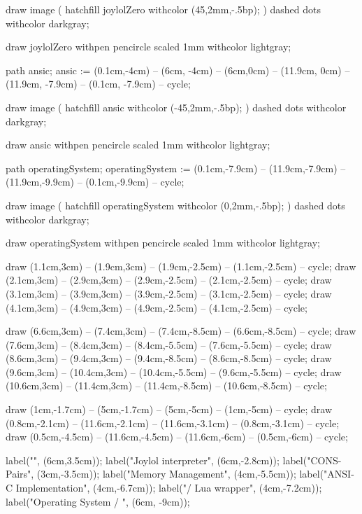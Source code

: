 draw image (
  hatchfill joylolZero
    withcolor (45,2mm,-.5bp);
) dashed dots withcolor darkgray;

draw joylolZero
  withpen pencircle scaled 1mm
  withcolor lightgray;

path ansic;
ansic := (0.1cm,-4cm) -- (6cm, -4cm) --
     (6cm,0cm) -- (11.9cm, 0cm) -- (11.9cm, -7.9cm) -- (0.1cm, -7.9cm) -- cycle;

draw image (
  hatchfill ansic
    withcolor (-45,2mm,-.5bp);
) dashed dots withcolor darkgray;

draw ansic
  withpen pencircle scaled 1mm
  withcolor lightgray;

path operatingSystem;
operatingSystem := (0.1cm,-7.9cm) -- (11.9cm,-7.9cm) --
  (11.9cm,-9.9cm) -- (0.1cm,-9.9cm) -- cycle;
  
draw image (
  hatchfill operatingSystem
    withcolor (0,2mm,-.5bp);
) dashed dots withcolor darkgray;

draw operatingSystem
  withpen pencircle scaled 1mm
  withcolor lightgray;


draw (1.1cm,3cm) -- (1.9cm,3cm) -- (1.9cm,-2.5cm) -- (1.1cm,-2.5cm) -- cycle;
draw (2.1cm,3cm) -- (2.9cm,3cm) -- (2.9cm,-2.5cm) -- (2.1cm,-2.5cm) -- cycle;
draw (3.1cm,3cm) -- (3.9cm,3cm) -- (3.9cm,-2.5cm) -- (3.1cm,-2.5cm) -- cycle;
draw (4.1cm,3cm) -- (4.9cm,3cm) -- (4.9cm,-2.5cm) -- (4.1cm,-2.5cm) -- cycle;

draw (6.6cm,3cm) -- (7.4cm,3cm) -- (7.4cm,-8.5cm) -- (6.6cm,-8.5cm) -- cycle;
draw (7.6cm,3cm) -- (8.4cm,3cm) -- (8.4cm,-5.5cm) -- (7.6cm,-5.5cm) -- cycle;
draw (8.6cm,3cm) -- (9.4cm,3cm) -- (9.4cm,-8.5cm) -- (8.6cm,-8.5cm) -- cycle;
draw (9.6cm,3cm) -- (10.4cm,3cm) -- (10.4cm,-5.5cm) -- (9.6cm,-5.5cm) -- cycle;
draw (10.6cm,3cm) -- (11.4cm,3cm) -- (11.4cm,-8.5cm) -- (10.6cm,-8.5cm) -- cycle;

draw (1cm,-1.7cm) -- (5cm,-1.7cm) -- (5cm,-5cm) -- (1cm,-5cm) -- cycle;
draw (0.8cm,-2.1cm) -- (11.6cm,-2.1cm) -- (11.6cm,-3.1cm) -- (0.8cm,-3.1cm) -- cycle;
draw (0.5cm,-4.5cm) -- (11.6cm,-4.5cm) -- (11.6cm,-6cm) -- (0.5cm,-6cm) -- cycle;


label("", (6cm,3.5cm));
label("Joylol interpreter", (6cm,-2.8cm));
label("CONS-Pairs", (3cm,-3.5cm));
label("Memory Management", (4cm,-5.5cm));
label("ANSI-C Implementation", (4cm,-6.7cm));
label("/ Lua wrapper", (4cm,-7.2cm));
label("Operating System / \LuaTeX", (6cm, -9cm));

